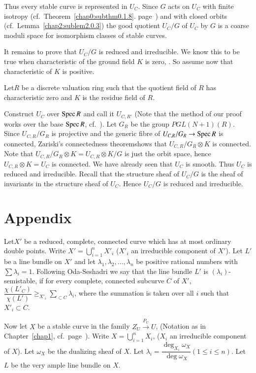 Thus every stable curve is represented in $U_C$. Since $G$ acts on
$U_C$ with finite isotropy (cf.\ Theorem~\ref{chap0:subthm0.1.8}. 
page~\pageref{chap0:subthm0.1.8}) and with 
closed orbits (cf.\ Lemma~\ref{chap2:sublem2.0.3}) the good quotient
$U_C/G$ of $U_C$ by $G$ is a coarse moduli space for isomorphism 
classes of stable curves. 

It remains to prove that $U_C/G$ is reduced and irreducible. 
We know this to be true when characteristic of the ground field $K$ is
zero, \cite{key11}. So assume now that characteristic of $K$ is positive. 

\noindent
Let\pageoriginale $R$ be a discrete valuation ring such that the
quotient field of $R$ has characteristic zero and $K$ is the residue
field of $R$.  

Construct $U_C$ over $\operatorname{Spec} R$ and call it $U_{C,R'}$  (Note that the
method of our proof works over the base $\operatorname{Spec} R$, cf.\ \cite{key9}). 
Let $G_R$ be the group $PGL(N+1) (R)$. Since $U_{C,R}/G_R$ is
projective and the  generic fibre of $U_{C,R}/G_R \to \operatorname{Spec} R$ is
connected, Zariski's connectedness theorem\break shows that $U_{C,R}/G_R
\otimes K$ is connected. Note that $U_{C,R}/G_R \otimes K =
U_{C,R}\otimes K/G$ is just the orbit space, hence $U_{C,R}\otimes K =
U_C$ is connected. We have already seen that $U_C$ is smooth. 
Thus $U_C$ is reduced and irreducible. Recall that the structure sheaf
of $U_C/G$ is the sheaf of invariants in the structure sheaf of
$U_C$.  Hence $U_C/G$ is reduced and irreducible.

\newpage

\chapter*{Appendix}


Let\pageoriginale $X'$ be a reduced, complete, connected curve which
has at most ordinary double points. Write
$X'=\bigcup\limits^{n}_{i=1}X'_i$ ($X'_i$ an irreducible component of
$X'$). Let $L'$ be a line bundle on $X'$ and let
$\lambda_1,\lambda_2,\ldots,\lambda_n$ be positive rational numbers
with $\sum \lambda_i =1$.  Following Oda-Seshadri \cite{key8} we say that the
line bundle $L'$ is $(\lambda_i)$-semistable, if for every complete,
connected subcurve $C$ of $X'$, $\dfrac{\chi(L'_C)}{\chi(L')} \ge
_{X'_i}\underset{\subset C}\sum \lambda_i$, where the summation is
taken over all $i$ such that $X'_i \subset C$.  

Now let $X$ be a stable curve in the family $Z_U \xrightarrow{P_U} U$,
(Notation as in Chapter~\ref{chap1}, cf.\ page~\pageref{c1:eqq1}). Write $X = \bigcup
\limits^{n}_{i=1}X_i$, ($X_i$ an irreducible component of $X$). Let
$\omega_X$ be the dualizing sheaf of $X$. Let $\lambda_i=
\dfrac{\deg_{X_i}\omega_X}{\deg \omega_X} (1 \le i \le n)$. Let $L$ be
the very ample line bundle on $X$. 



